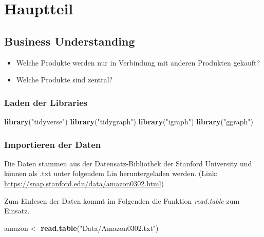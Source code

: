 \documentclass[
  12 pt,
]{article}
\newenvironment{Shaded}{\begin{snugshade}}{\end{snugshade}}
\newcommand{\KeywordTok}[1]{\textcolor[rgb]{0.13,0.29,0.53}{\textbf{#1}}}
\newcommand{\NormalTok}[1]{#1}
\newcommand{\StringTok}[1]{\textcolor[rgb]{0.31,0.60,0.02}{#1}}
\providecommand{\tightlist}{%
  \setlength{\itemsep}{0pt}\setlength{\parskip}{0pt}}
\begin{document}
\newpage

\hypertarget{hauptteil}{%
\section{Hauptteil}\label{hauptteil}}

\hypertarget{business-understanding}{%
\subsection{Business Understanding}\label{business-understanding}}

\begin{itemize}
\tightlist
\item
  Welche Produkte werden nur in Verbindung mit anderen Produkten
  gekauft?
\item
  Welche Produkte sind zentral?
\end{itemize}

\hypertarget{laden-der-libraries}{%
\subsubsection{Laden der Libraries}\label{laden-der-libraries}}

\begin{Shaded}
\begin{Highlighting}[]
\KeywordTok{library}\NormalTok{(}\StringTok{"tidyverse"}\NormalTok{)}
\KeywordTok{library}\NormalTok{(}\StringTok{"tidygraph"}\NormalTok{)}
\KeywordTok{library}\NormalTok{(}\StringTok{"igraph"}\NormalTok{)}
\KeywordTok{library}\NormalTok{(}\StringTok{"ggraph"}\NormalTok{)}
\end{Highlighting}
\end{Shaded}

\hypertarget{importieren-der-daten}{%
\subsubsection{Importieren der Daten}\label{importieren-der-daten}}

Die Daten stammen aus der Datensatz-Bibliothek der Stanford University
und können als .txt unter folgendem Lin heruntergeladen werden. (Link:
\url{https://snap.stanford.edu/data/amazon0302.html})

Zum Einlesen der Daten kommt im Folgenden die Funktion
\textit{read.table} zum Einsatz.\\

\begin{Shaded}
\begin{Highlighting}[]
\NormalTok{amazon <-}\StringTok{ }\KeywordTok{read.table}\NormalTok{(}\StringTok{"Data/Amazon0302.txt"}\NormalTok{)}
\end{Highlighting}
\end{Shaded}
\end{document}
